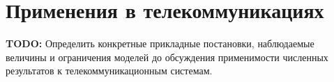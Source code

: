 \section{Применения в телекоммуникациях}
\label{sec:telecom-applications}

\textbf{TODO:} Определить конкретные прикладные постановки,
наблюдаемые величины и ограничения моделей до обсуждения применимости
численных результатов к телекоммуникационным системам.
